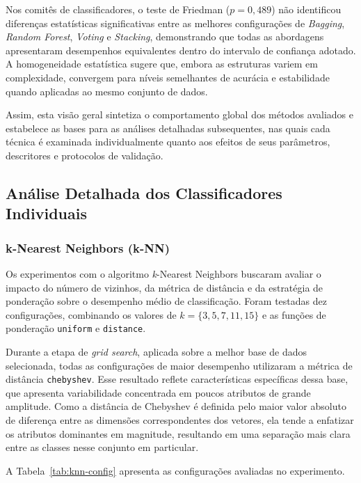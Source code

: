 \documentclass[12pt]{article}
\begin{document}
Nos comitês de classificadores, o teste de Friedman ($p = 0{,}489$) não identificou diferenças estatísticas significativas entre as melhores configurações de \textit{Bagging}, \textit{Random Forest}, \textit{Voting} e \textit{Stacking}, demonstrando que todas as abordagens apresentaram desempenhos equivalentes dentro do intervalo de confiança adotado. A homogeneidade estatística sugere que, embora as estruturas variem em complexidade, convergem para níveis semelhantes de acurácia e estabilidade quando aplicadas ao mesmo conjunto de dados.

Assim, esta visão geral sintetiza o comportamento global dos métodos avaliados e estabelece as bases para as análises detalhadas subsequentes, nas quais cada técnica é examinada individualmente quanto aos efeitos de seus parâmetros, descritores e protocolos de validação.

\subsection{Análise Detalhada dos Classificadores Individuais}

\subsubsection{k-Nearest Neighbors (k-NN)}

Os experimentos com o algoritmo \textit{k}-Nearest Neighbors buscaram avaliar o impacto do número de vizinhos, da métrica de distância e da estratégia de ponderação sobre o desempenho médio de classificação. Foram testadas dez configurações, combinando os valores de $k = \{3, 5, 7, 11, 15\}$ e as funções de ponderação \texttt{uniform} e \texttt{distance}. 

Durante a etapa de \textit{grid search}, aplicada sobre a melhor base de dados selecionada, todas as configurações de maior desempenho utilizaram a métrica de distância \texttt{chebyshev}. Esse resultado reflete características específicas dessa base, que apresenta variabilidade concentrada em poucos atributos de grande amplitude. Como a distância de Chebyshev é definida pelo maior valor absoluto de diferença entre as dimensões correspondentes dos vetores, ela tende a enfatizar os atributos dominantes em magnitude, resultando em uma separação mais clara entre as classes nesse conjunto em particular.

A Tabela~\ref{tab:knn-config} apresenta as configurações avaliadas no experimento.
\end{document}
